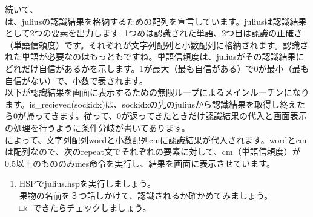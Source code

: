 続いて、\\
は、juliusの認識結果を格納するための配列を宣言しています。juliusは認識結果として2つの要素を出力します: 1つめは認識された単語、2つ目は認識の正確さ（単語信頼度）です。それぞれが文字列配列と小数配列に格納されます。認識された単語が必要なのはもっともですね。単語信頼度は、juliusがその認識結果にどれだけ自信があるかを示します。1が最大（最も自信がある）で0が最小（最も自信がない）で、小数で表されます。\\
以下が認識結果を画面に表示するための無限ループによるメインルーチンになります。is\_recieved(sockidx)は、sockidxの先のjuliusから認識結果を取得し終えたら0が帰ってきます。従って、0が返ってきたときだけ認識結果の代入と画面表示の処理を行うように条件分岐が書いてあります。\\
によって、文字列配列wordと小数配列cmに認識結果が代入されます。wordとcmは配列なので、次のrepeat文でそれぞれの要素に対して、cm（単語信頼度）が0.5以上のもののみmes命令を実行し、結果を画面に表示させています。\\
\begin{tcolorbox}[title=\useOmetoi]
\begin{enumerate}
\item HSPでjulius.hspを実行しましょう。\\果物の名前を３つ話しかけて、認識されるか確かめてみましょう。\\□←できたらチェックしましょう。
\end{enumerate}
\end{tcolorbox}
